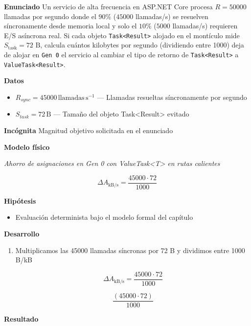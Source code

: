 \documentclass{book}
\begin{document}
\begin{tcolorbox}[title={Problema resuelto}, studiumworked, breakable]

\noindent\textbf{Enunciado}
Un servicio de alta frecuencia en ASP.NET Core procesa \(R = 50000\) llamadas por segundo donde el \(90\%\) (\(45000\) llamadas/s) se resuelven síncronamente desde memoria local y solo el \(10\%\) (\(5000\) llamadas/s) requieren E/S asíncrona real. Si cada objeto \texttt{Task<Result>} alojado en el montículo mide \(S_{\text{task}} = 72\text{ B}\), calcula cuántos kilobytes por segundo (dividiendo entre 1000) deja de alojar en \texttt{Gen 0} el servicio al cambiar el tipo de retorno de \texttt{Task<Result>} a \texttt{ValueTask<Result>}.

\noindent\textbf{Datos}
\begin{itemize}
\item $R_{sync} = 45000\,\mathrm{llamadas}\,\mathrm{s}^{-1}$ — Llamadas resueltas síncronamente por segundo
\item $S_{task} = 72\,\mathrm{B}$ — Tamaño del objeto Task<Result> evitado
\end{itemize}

\noindent\textbf{Incógnita}
Magnitud objetivo solicitada en el enunciado

\noindent\textbf{Modelo físico}

\noindent\textit{Ahorro de asignaciones en Gen 0 con ValueTask<T> en rutas calientes}

\[
\Delta A_{\text{kB/s}} = \frac{45000 \cdot 72}{1000}
\]

\noindent\textbf{Hipótesis}
\begin{itemize}
\item Evaluación determinista bajo el modelo formal del capítulo
\end{itemize}

\noindent\textbf{Desarrollo}
\begin{enumerate}
\item
Multiplicamos las 45000 llamadas síncronas por 72 B y dividimos entre 1000 B/kB

\[
\Delta A_{\text{kB/s}} = \frac{45000 \cdot 72}{1000}
\]

\[
\frac{\left(45000\cdot 72\right)}{1000}
\]
\end{enumerate}

\noindent\textbf{Resultado}


\end{tcolorbox}
\end{document}

